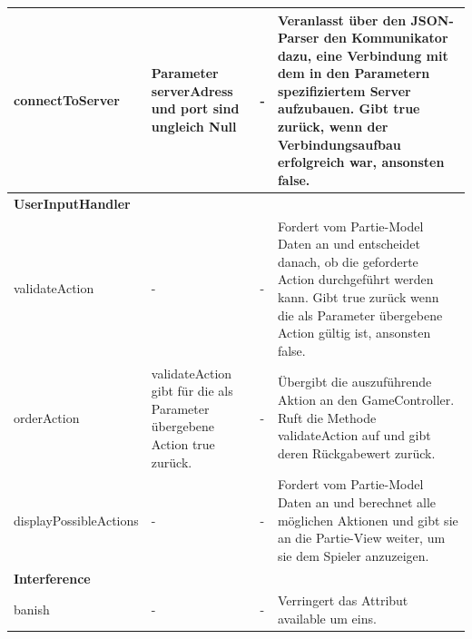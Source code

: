 \begin{center}
	\begin{tabular}{|p{4.0cm}|p{2.2cm}|p{2.2cm}|p{4cm}|}	
		\hline
		connectToServer & Parameter serverAdress und port sind ungleich Null & - & Veranlasst über den JSON-Parser den Kommunikator dazu, eine Verbindung mit dem in den Parametern spezifiziertem Server aufzubauen. Gibt true zurück, wenn der Verbindungsaufbau erfolgreich war, ansonsten false.\\\hline
		\multicolumn{4}{|l|}{\textbf{UserInputHandler}} \\\hline
		validateAction & - & - & Fordert vom Partie-Model Daten an und entscheidet danach, ob die geforderte Action durchgeführt werden kann. Gibt true zurück wenn die als Parameter übergebene Action gültig ist, ansonsten false.\\\hline
		orderAction & validateAction gibt für die als Parameter übergebene Action true zurück. & - & Übergibt die auszuführende Aktion an den GameController. Ruft die Methode validateAction auf und gibt deren Rückgabewert zurück.\\\hline
		displayPossibleActions & - & - & Fordert vom Partie-Model Daten an und berechnet alle möglichen Aktionen und gibt sie an die Partie-View weiter, um sie dem Spieler anzuzeigen.\\\hline
		\multicolumn{4}{|l|}{\textbf{Interference}} \\\hline
		banish & - & - & Verringert das Attribut available um eins.\\\hline
		
	\end{tabular}
\end{center}
